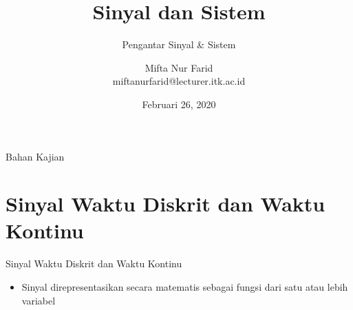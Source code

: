 \documentclass[aspectratio=169]{beamer}
\author{Mifta Nur Farid \\
	miftanurfarid@lecturer.itk.ac.id}
\title{Sinyal dan Sistem}
\subtitle{Pengantar Sinyal \& Sistem}
\institute{Teknik Elektro \\ Institut Teknologi Kalimantan \\ Balikpapan, Indonesia}
\date{\tiny Februari 26, 2020}
\begin{document}
\begin{frame}[t,plain]
\titlepage
\end{frame}

\begin{frame}{Bahan Kajian}
    \tableofcontents[subsectionstyle=hide]
\end{frame}

\section{Sinyal Waktu Diskrit dan Waktu Kontinu}

\begin{frame}{Sinyal Waktu Diskrit dan Waktu Kontinu}
	\begin{itemize}
		\item Sinyal direpresentasikan secara matematis sebagai fungsi dari satu atau lebih variabel
	\end{itemize}
	
	\begin{figure}
		
		\caption{}
	\end{figure}
\end{frame}
\end{document}
